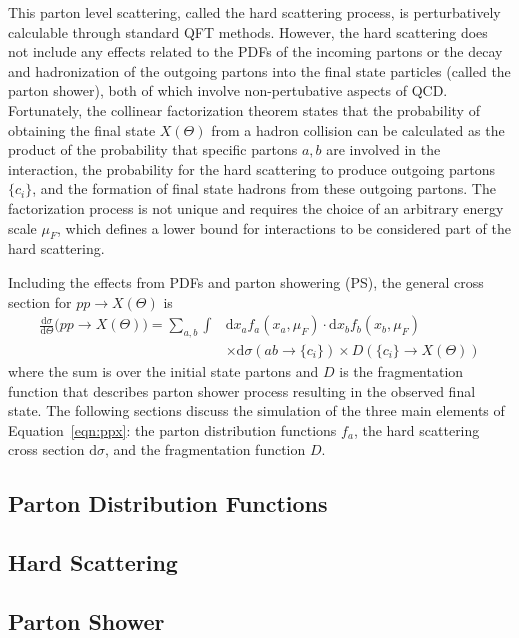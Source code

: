 This parton level scattering, called the hard scattering process, is perturbatively calculable through standard QFT methods.
However, the hard scattering does not include any effects related to the PDFs of the incoming partons or the decay and hadronization of the outgoing partons into the final state particles (called the parton shower), both of which involve non-pertubative aspects of QCD.
Fortunately, the collinear factorization theorem states that the probability of obtaining the final state $X(\Theta)$ from a hadron collision can be calculated as the product of the probability that specific partons $a,b$ are involved in the interaction, the probability for the hard scattering to produce outgoing partons $\{c_i\}$, and the formation of final state hadrons from these outgoing partons.
The factorization process is not unique and requires the choice of an arbitrary energy scale $\mu_F$, which defines a lower bound for interactions to be considered part of the hard scattering.  

Including the effects from PDFs and parton showering (PS), the general cross section for $pp \rightarrow X(\Theta)$ is
\begin{align}
  \label{eqn:ppx}
  \frac{\text{d}\sigma}{\text{d}\Theta} \Big(pp \rightarrow X(\Theta) \Big) =
  \sum_{a,b} \int & \text{d} x_a f_a(x_a, \mu_F) \cdot \text{d} x_b f_b(x_b, \mu_F)  \nonumber \\
  & \times \text{d}\sigma \left(ab \rightarrow \{c_i\} \right)
  \times D \left( \{c_i\} \rightarrow X(\Theta) \right) 
\end{align}
where the sum is over the initial state partons and $D$ is the fragmentation function that describes parton shower process resulting in the observed final state.
The following sections discuss the simulation of the three main elements of Equation~\ref{eqn:ppx}: the parton distribution functions $f_a$, the hard scattering cross section $\text{d}\sigma$, and the fragmentation function $D$.

\subsection{Parton Distribution Functions}

\subsection{Hard Scattering}

\subsection{Parton Shower}
